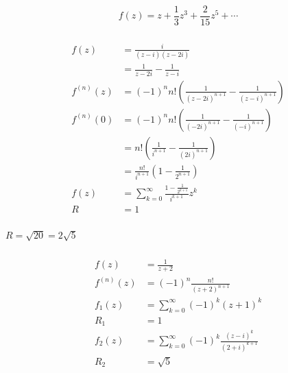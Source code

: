 \documentclass{article}
\begin{document}
\[f(z) = z + \frac{1}{3} z^3 + \frac{2}{15} z^5 + \cdots\]

\setcounter{subsubsection}{24}
\subsubsection{}

\begin{align*}
  f(z)       & = \frac{i}{(z - i) (z - 2 i)}                                                      \\
             & = \frac{1}{z - 2 i} - \frac{1}{z - i}                                              \\
  f^{(n)}(z) & = (-1)^n n! \left( \frac{1}{(z - 2 i)^{n + 1}} - \frac{1}{(z - i)^{n + 1}} \right) \\
  f^{(n)}(0) & = (-1)^n n! \left( \frac{1}{(-2 i)^{n + 1}} - \frac{1}{(-i)^{n + 1}} \right)       \\
             & = n! \left( \frac{1}{i^{n + 1}} - \frac{1}{(2 i)^{n + 1}} \right)                  \\
             & = \frac{n!}{i^{n + 1}} \left( 1 - \frac{1}{2^{n + 1}} \right)                      \\
  f(z)       & = \sum_{k = 0}^\infty \frac{1 - \frac{1}{2^{k + 1}}}{i^{k + 1}} z^k                \\
  R          & = 1
\end{align*}

\setcounter{subsubsection}{26}
\subsubsection{}

$R = \sqrt{20} = 2 \sqrt{5}$

\setcounter{subsubsection}{28}
\subsubsection{}

\begin{align*}
  f(z)       & = \frac{1}{z + 2}                                              \\
  f^{(n)}(z) & = (-1)^n \frac{n!}{(z + 2)^{n + 1}}                            \\
  f_1(z)     & = \sum_{k = 0}^\infty (-1)^k (z + 1)^k                         \\
  R_1        & = 1                                                            \\
  f_2(z)     & = \sum_{k = 0}^\infty (-1)^k \frac{(z - i)^k}{(2 + i)^{k + 1}} \\
  R_2        & = \sqrt{5}
\end{align*}
\end{document}
